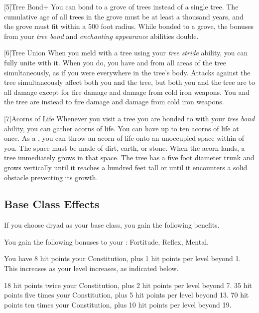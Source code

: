 [5]{Tree Bond+} You can bond to a grove of trees instead of a single tree.
The cumulative age of all trees in the grove must be at least a thousand years, and the grove must fit within a 500 foot radius.
While bonded to a grove, the bonuses from your \textit{tree bond} and \textit{enchanting appearance} abilities double.

[6]{Tree Union} When you meld with a tree using your \textit{tree stride} ability, you can fully unite with it.
When you do, you have  and  from all areas of the tree simultaneously, as if you were everywhere in the tree's body.
Attacks against the tree simultaneously affect both you and the tree, but both you and the tree are \impervious to all damage except for fire damage and damage from cold iron weapons.
You and the tree are instead \vulnerable to fire damage and damage from cold iron weapons.

[7]{Acorns of Life} Whenever you visit a tree you are bonded to with your \textit{tree bond} ability, you can gather acorns of life.
You can have up to ten acorns of life at once.
As a , you can throw an acorn of life onto an unoccupied  space within \medrange of you.
The space must be made of dirt, earth, or stone.
When the acorn lands, a tree immediately grows in that space.
The tree has a five foot diameter trunk and grows vertically until it reaches a hundred feet tall or until it encounters a solid obstacle preventing its growth.

\subsection{Base Class Effects}
If you choose dryad as your base class, you gain the following benefits.

You gain the following bonuses to your :  Fortitude,  Reflex,  Mental.

You have 8 hit points \add  your Constitution, plus 1 hit points per level beyond 1.
This increases as your level increases, as indicated below.
\begin{itemize}
	 18 hit points \add twice your Constitution, plus 2 hit points per level beyond 7.
	 35 hit points \add five times your Constitution, plus 5 hit points per level beyond 13.
	 70 hit points \add ten times your Constitution, plus 10 hit points per level beyond 19.
\end{itemize}

